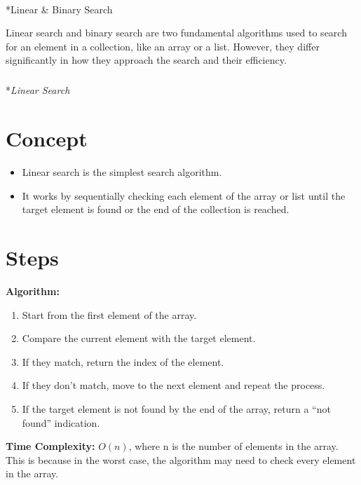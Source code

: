 \documentclass[
  letterpaper,
  DIV=11,
  numbers=noendperiod]{scrreprt}
\makeatletter
\let\oldparagraph\paragraph
\renewcommand{\paragraph}{
    \@ifstar
      \xxxParagraphStar
      \xxxParagraphNoStar
  }
\newcommand{\xxxParagraphStar}[1]{\oldparagraph*{#1}\mbox{}}
\newcommand{\xxxParagraphNoStar}[1]{\oldparagraph{#1}\mbox{}}
\let\oldsubparagraph\subparagraph
\renewcommand{\subparagraph}{
    \@ifstar
      \xxxSubParagraphStar
      \xxxSubParagraphNoStar
  }
\newcommand{\xxxSubParagraphStar}[1]{\oldsubparagraph*{#1}\mbox{}}
\newcommand{\xxxSubParagraphNoStar}[1]{\oldsubparagraph{#1}\mbox{}}
\providecommand{\tightlist}{%
  \setlength{\itemsep}{0pt}\setlength{\parskip}{0pt}}
\makeatother
\begin{document}
\paragraph*{Linear \& Binary Search}\label{linear-binary-search}

Linear search and binary search are two fundamental algorithms used to
search for an element in a collection, like an array or a list. However,
they differ significantly in how they approach the search and their
efficiency.

\subparagraph*{\texorpdfstring{\emph{Linear
Search}}{Linear Search}}\label{linear-search}

\section{Concept}

\begin{itemize}
\tightlist
\item
  Linear search is the simplest search algorithm.
\item
  It works by sequentially checking each element of the array or list
  until the target element is found or the end of the collection is
  reached.
\end{itemize}

\section{Steps}

\textbf{Algorithm:}

\begin{enumerate}
\def\labelenumi{\arabic{enumi}.}
\tightlist
\item
  Start from the first element of the array.
\item
  Compare the current element with the target element.
\item
  If they match, return the index of the element.
\item
  If they don't match, move to the next element and repeat the process.
\item
  If the target element is not found by the end of the array, return a
  ``not found'' indication.
\end{enumerate}

\textbf{Time Complexity:} \(O(n)\), where n is the number of elements in
the array. This is because in the worst case, the algorithm may need to
check every element in the array.
\end{document}
